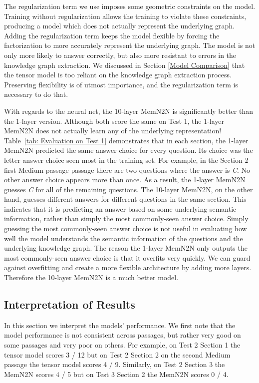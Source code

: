 \documentclass[pageno]{final_paper}
\begin{document}
The regularization term we use imposes some geometric constraints on the model.
Training without regularization allows the training to violate these
constraints, producing a model which does not actually represent the underlying
graph. Adding the regularization term keeps the model flexible by forcing the
factorization to more accurately represent the underlying graph. The model is
not only more likely to answer correctly, but also more resistant to errors in
the knowledge graph extraction. We discussed in Section \ref{Model Comparison}
that the tensor model is too reliant on the knowledge graph extraction process.
Preserving flexibility is of utmost importance, and the regularization term is
necessary to do that.

With regards to the neural net, the 10-layer MemN2N is significantly better than
the 1-layer version. Although both score the same on Test 1, the 1-layer MemN2N
does not actually learn any of the underlying representation! Table~\ref{tab:
Evaluation on Test 1} demonstrates that in each section, the 1-layer MemN2N
predicted the same answer choice for every question. Its choice was the letter
answer choice seen most in the training set. For example, in the Section 2 first
Medium passage passage there are two questions where the answer is \textit{C}.
No other answer choice appears more than once. As a result, the 1-layer MemN2N
guesses \textit{C} for all of the remaining questions. The 10-layer MemN2N, on
the other hand, guesses different answers for different questions in the same
section. This indicates that it is predicting an answer based on some underlying
semantic information, rather than simply the most commonly-seen answer choice.
Simply guessing the most commonly-seen answer choice is not useful in evaluating
how well the model understands the semantic information of the questions and the
underlying knowledge graph. The reason the 1-layer MemN2N only outputs the most
commonly-seen answer choice is that it overfits very quickly. We can guard
against overfitting and create a more flexible architecture by adding more
layers. Therefore the 10-layer MemN2N is a much better model.

\subsection{Interpretation of Results}
\label{Interpretation of Results}

In this section we interpret the models' performance. We first note that the
model performance is not consistent across passages, but rather very good on
some passages and very poor on others. For example, on Test 2 Section 1 the
tensor model scores 3 / 12 but on Test 2 Section 2 on the second Medium passage
the tensor model scores 4 / 9. Similarly, on Test 2 Section 3 the MemN2N scores
4 / 5 but on Test 3 Section 2 the MemN2N scores 0 / 4.
\end{document}
